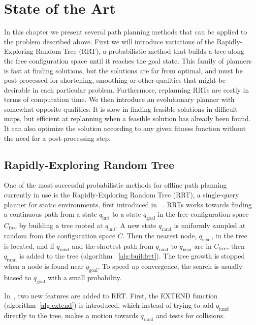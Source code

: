 \chapter{State of the Art}
\label{sec:stateoftheart}
In this chapter we present several path planning methods that can be
applied to the problem described above. First we will introduce variations of
the Rapidly-Exploring Random Tree (RRT), a probabilistic method that builds a
tree along the free configuration space until it reaches the goal state. This
family of planners is fast at finding solutions, but the solutions are far from
optimal, and must be post-processed for shortening, smoothing or other qualities
that might be desirable in each particular problem. Furthermore, replanning RRTs
are costly in terms of computation time. We then introduce an
evolutionary planner with somewhat opposite qualities: It is slow in finding
feasible solutions in difficult maps, but efficient at replanning when a
feasible solution has already been found. It can also optimize the solution
according to any given fitness function without the need for a post-processing
step.
\section{Rapidly-Exploring Random Tree}
\label{sec:RRT}
One of the most successful probabilistic methods for offline path planning
currently in use is the Rapidly-Exploring Random Tree (RRT), a single-query planner for
static environments, first introduced in~%
\cite{Lavalle98}. RRTs works towards finding a continuous path from a state
\(q_{\text{init}}\) to a state \(q_{\text{goal}}\) in the free configuration
space \(C_{\text{free}}\) by
building a tree rooted at \(q_{\text{init}}\). A new state \(q_{\text{rand}}\) is uniformly
sampled at random from the configuration space \(C\). Then the nearest node,
\(q_{\text{near}}\), in
the tree is located, and if \(q_{\text{rand}}\) and the shortest path from
\(q_{\text{rand}}\) to
\(q_{\text{near}}\) are in \(C_{\text{free}}\), then \(q_{\text{rand}}\) is added to the tree (algorithm~%
\ref{alg:buildrrt}). The tree
growth is stopped when a node is found near \(q_{\text{goal}}\). To speed up convergence,
the search is usually biased to \(q_{\text{goal}}\) with a small probability.

In~\cite{Kuffner00}, two new features are added to RRT. First, the EXTEND
function (algorithm~\ref{alg:extend}) is introduced, which instead of trying
to add \(q_{\text{rand}}\) directly to
the tree, makes a motion towards \(q_{\text{rand}}\) and tests for collisions.

